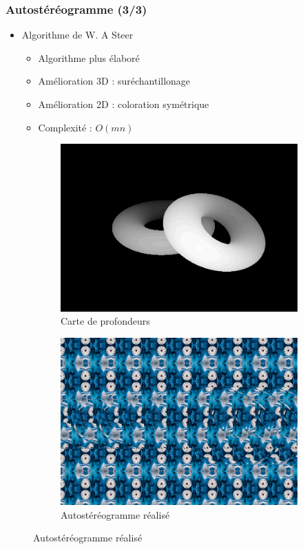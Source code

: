 \documentclass{beamer}
\begin{document}
%
\begin{frame}
\frametitle{Autostéréogramme (3/3)}
\begin{itemize}[label=$\bullet$]
	\item Algorithme de W. A Steer \cite{wasteer}
	\begin{itemize}[label=$\circ$]
	\item Algorithme plus élaboré
	\item Amélioration 3D : suréchantillonage
	\item Amélioration 2D : coloration symétrique
	\item Complexité : $O(mn)$
	\end{itemize}
\end{itemize}
\begin{figure}
\centering
\caption{Résultat obtenu avec l'algorithme de W. A Steer}
\begin{subfigure}{.4\textwidth}
  \centering
  \includegraphics[width=1\linewidth]{donutdepth.png}
  \caption{Carte de profondeurs}
\end{subfigure}
\begin{subfigure}{.4\textwidth}
  \centering
  \includegraphics[width=1\linewidth]{donut2.png}
  \caption{Autostéréogramme réalisé}
\end{subfigure}
\end{figure}

\end{frame}
\end{document}

